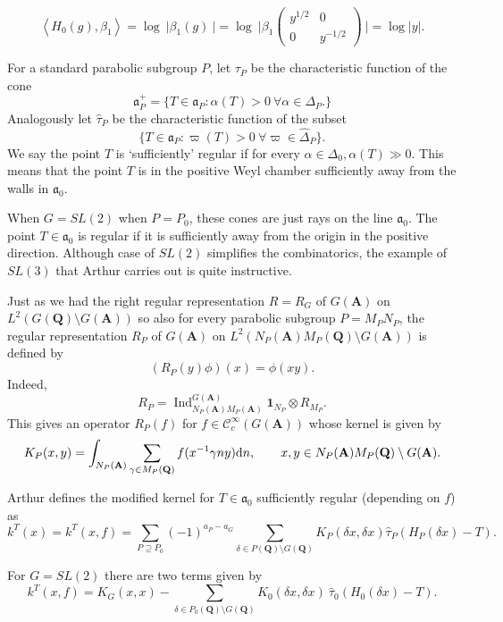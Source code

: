 \documentclass[11pt]{amsart}
\def\apg{a_{P} - a_{G}}
\def\A{\mathbf A}
\def\Q{\mathbf Q}
\def\CCC{\mathcal C}
\def\aaa{\mathfrak a}
\def\d{\text d}
\def\bs{\setminus}
\def\Ind{\operatorname{Ind}}
\def\Ltwo{L^2}
\def\mod#1{\lvert #1 \rvert} %
\def\sprod#1#2{\left\langle #1 , #2 \right\rangle}  %
\theoremstyle{remark}
\begin{document}
\[ \sprod{H_0(g)}{\beta_1} = \log \ \mod{\beta_1(g)\ } = \log \ \mod{\beta_1 
			\begin{pmatrix} y^{1/2} & 0 \\ 0 & y^{-1/2} \end{pmatrix} \ } = \log \mod{y}. \]

For a standard parabolic subgroup $P$, let $\tau_P$ be the characteristic function of the cone 
\[ \aaa_P^+ = \{ T \in \aaa_P : \alpha(T) > 0 \ \forall \alpha \in \Delta_P. \} \]
Analogously let $\hat\tau_P$ be the characteristic function of the subset
\[ \{ T \in \aaa_P : \varpi(T) > 0 \ \forall \varpi \in \hat\Delta_P \}. \]
We say the point $T$ is `sufficiently' regular if for every $\alpha \in \Delta_0, \alpha(T) \gg 0$. This means that the point $T$ is in the positive Weyl chamber sufficiently away from the walls in $\aaa_0$. 

When $G = SL(2)$ when $P = P_0$, these cones are just rays on the line $\aaa_0$. The point $T \in \aaa_0$ is regular if it is sufficiently away from the origin in the positive direction. Although case of $SL(2)$ simplifies the combinatorics, the example of $SL(3)$ that Arthur carries out is quite instructive. 

Just as we had the right regular representation $R = R_G$ of $G(\A)$ on $\Ltwo(G(\Q) \bs G(\A))$ so also for every parabolic subgroup $P = M_P N_P$, the regular representation $R_P$ of $G(\A)$ on $\Ltwo(N_P(\A) M_P(\Q) \bs G(\A))$ is defined by 
\[ (R_P(y)\phi)(x) = \phi(xy). \]
Indeed, 
\[ R_P = \Ind_{N_P(\A)M_P(\A)}^{G(\A)} \mathbf 1_{N_P} \otimes R_{M_P}. \]
This gives an operator $R_P(f)$ for $f \in \CCC_c^\infty(G(\A))$ whose kernel is given by
\[ K_P(x, y) = \int_{N_P(\A)} \sum_{\gamma \in M_P(\Q)} f(x^{-1} \gamma n y) \d n, \qquad 
		x, y \in N_P(\A)M_P(\Q)\bs G(\A). \]

Arthur defines the modified kernel for $T \in \aaa_0$ sufficiently regular (depending on $f$) as
\begin{equation} \label{kernel}
	k^T(x) = k^T(x, f) = \sum_{P \supseteq P_0} (-1)^{\apg} \sum_{\delta \in P(\Q) \bs G(\Q)}
		K_P(\delta x, \delta x) \hat\tau_P(H_P(\delta x) - T). 
\end{equation}

For $G = SL(2)$ there are two terms given by
\begin{equation} \label{k_sl2}
	k^T(x, f) = K_G(x, x) - \sum_{\delta \in P_0(\Q) \bs G(\Q)} K_0(\delta x, \delta x) \ \hat\tau_0(H_0(\delta x) - T).
\end{equation}
\end{document}

